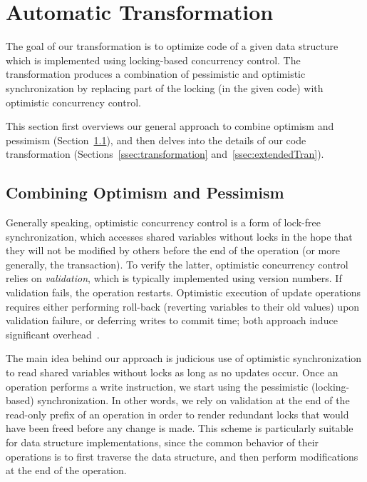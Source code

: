 \renewcommand{\ttdefault}{pcr}
\algrenewcommand{}
\algrenewcommand{}
\algrenewcommand{}
\algrenewcommand{}
\algrenewcommand{}
\algrenewcommand\textproc{\textit}



\section{Automatic Transformation}\label{sec:algorithm}

The goal of our transformation is to optimize code of a given data structure which is implemented using locking-based concurrency control.
The transformation produces a combination of pessimistic and optimistic synchronization
by replacing part of the  locking (in the given code) with optimistic concurrency control.


This section first overviews our general approach to combine optimism and pessimism (Section~\ref{ssec:overview}), and
then delves into the details of our code transformation (Sections~\ref{ssec:transformation} and~\ref{ssec:extendedTran}).


\subsection{Combining Optimism and Pessimism}\label{ssec:overview}

Generally speaking, optimistic concurrency control is a form of lock-free synchronization, which accesses shared variables without locks in the hope that they will not be modified by others before the end of the operation (or more generally, the transaction). To verify the latter, optimistic concurrency control relies on \emph{validation}, which is typically implemented using version numbers. If validation fails, the operation restarts. Optimistic execution of update operations requires either performing roll-back (reverting variables to their old values) upon validation failure, or deferring writes to commit time; both approach induce significant overhead~\cite{Cascaval:2008}.



The main idea behind our approach is judicious use of optimistic synchronization to read
shared variables without locks as long as no updates occur. Once an operation
performs a write instruction, we start using the pessimistic (locking-based) synchronization. In
other words, we rely on validation at the end of the read-only prefix of an operation in order to render redundant
locks that would have been freed
before any change is made.
This scheme is particularly suitable for data structure implementations,
since the common behavior of their operations
is to first traverse the data structure, and then
perform modifications at the end of the operation.



